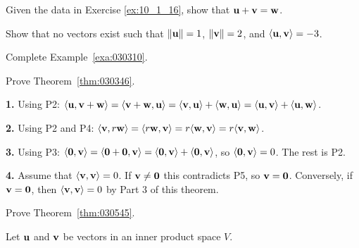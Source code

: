 \begin{multicols}{2}
\begin{ex}
\begin{sol}
\begin{enumerate}[label={\alph*.}]
\end{enumerate}
\end{sol}
\end{ex}

\begin{ex}
Given the data in Exercise \ref{ex:10_1_16}, show that $\textbf{u} + \textbf{v} = \textbf{w}$.
\end{ex}

\begin{ex}
Show that no vectors exist such that $\|\textbf{u}\| = 1$, $\|\textbf{v}\| = 2$, and $\langle\textbf{u}, \textbf{v}\rangle = -3$.
\end{ex}

\begin{ex} \label{ex:10_1_19}
Complete Example~\ref{exa:030310}.
\end{ex}

\begin{ex} \label{ex:10_1_20}
Prove Theorem~\ref{thm:030346}.

\begin{sol}
\textbf{1.} Using P2: 
$ \langle \textbf{u}, \textbf{v} + \textbf{w} \rangle = 
\langle \textbf{v} + \textbf{w}, \textbf{u} \rangle = 
\langle \textbf{v}, \textbf{u} \rangle + \langle \textbf{w}, \textbf{u} \rangle = 
\langle \textbf{u}, \textbf{v} \rangle + \langle \textbf{u}, \textbf{w} \rangle$.

\textbf{2.} Using P2 and P4: 
$\langle \textbf{v}, r\textbf{w} \rangle =
\langle r\textbf{w}, \textbf{v} \rangle =
r \langle \textbf{w}, \textbf{v} \rangle =
r \langle \textbf{v}, \textbf{w} \rangle$.

\textbf{3.} Using P3: 
$\langle \textbf{0}, \textbf{v} \rangle =
\langle \textbf{0} + \textbf{0}, \textbf{v} \rangle =
\langle \textbf{0}, \textbf{v} \rangle + \langle \textbf{0}, \textbf{v} \rangle
$, so $ \langle \textbf{0}, \textbf{v} \rangle = 0$. The rest is P2.

\textbf{4.} Assume that $\langle \textbf{v}, \textbf{v} \rangle = 0$. If $\textbf{v} \neq \textbf{0}$ this contradicts P5, so $\textbf{v} = \textbf{0}$. Conversely, if $\textbf{v} = \textbf{0}$, then $\langle \textbf{v}, \textbf{v} \rangle = 0$ by Part 3 of this theorem.
\end{sol}
\end{ex}

\begin{ex} \label{ex:10_1_21}
Prove Theorem~\ref{thm:030545}.
\end{ex}

\begin{ex}
Let $\textbf{u}$ and $\textbf{v}$ be vectors in an inner product space $V$.


\end{ex}
\end{multicols}
